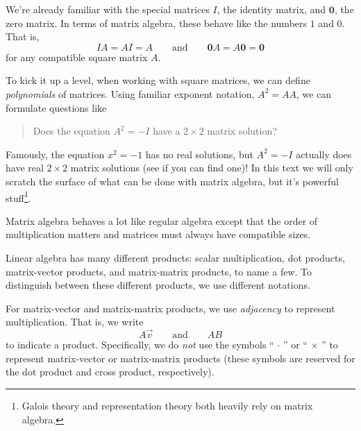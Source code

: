 We're already familiar with the special matrices $I$, the identity matrix, and $\mathbf 0$, the zero matrix.
In terms of matrix algebra, these behave like the numbers $1$ and $0$. That is,
\[
	IA=AI=A\qquad \text{and}\qquad \mathbf 0 A = A\mathbf 0=\mathbf 0
\]
for any compatible square matrix $A$.

To kick it up a level, when working with square matrices, we can define \emph{polynomials} of matrices. Using familiar exponent
notation, $A^2=AA$, we can formulate questions like
\begin{quote}
	Does the equation $A^2=-I$ have a $2\times 2$ matrix solution?
\end{quote}
Famously, the equation $x^2=-1$ has no real solutions, but $A^2=-I$ actually does have real $2\times 2$ matrix solutions (see if you can
find one)! In this text we will only scratch the surface of what can be done with matrix algebra, but it's powerful stuff\footnote{ Galois
theory and representation theory both heavily rely on matrix algebra.}.

\begin{emphbox}Matrix algebra behaves a lot like regular algebra except that the order of multiplication
	matters and matrices must always have compatible sizes.
\end{emphbox}

Linear algebra has many different products: scalar multiplication, dot products,
matrix-vector products, and matrix-matrix products, to name a few.
To distinguish between these different products, we use different notations.

For matrix-vector and matrix-matrix products, we use \emph{adjacency} to represent multiplication. That is,
we write
\[
	A\vec v\qquad\text{and}\qquad AB
\]
to indicate a product.
Specifically, we do \emph{not} use the symbols ``$\,\cdot\,$'' or ``$\,\times\,$'' to represent matrix-vector
or matrix-matrix products (these symbols are reserved for the dot product and cross product, respectively).


